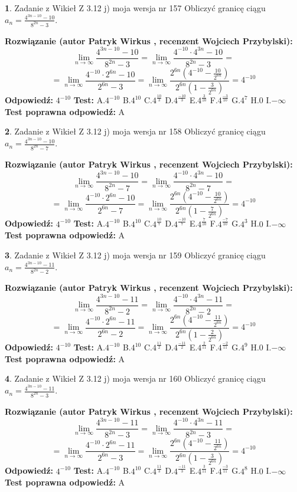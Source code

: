 \documentclass[12pt, a4paper]{article}
\theoremstyle{definition} %
\newtheorem{zad}{}
\newcommand{\zadStart}[1]{\begin{zad}#1\newline}
\newcommand{\zadStop}{\end{zad}}
\newcommand{\rozwStart}[2]{\noindent \textbf{Rozwiązanie (autor #1 , recenzent #2): }\newline}
\newcommand{\rozwStop}{\newline}
\newcommand{\odpStart}{\noindent \textbf{Odpowiedź:}\newline}
\newcommand{\odpStop}{\newline}
\newcommand{\testStart}{\noindent \textbf{Test:}\newline}
\newcommand{\testStop}{\newline}
\newcommand{\kluczStart}{\noindent \textbf{Test poprawna odpowiedź:}\newline}
\newcommand{\kluczStop}{\newline}
\begin{document}
\zadStart{Zadanie z Wikieł Z 3.12 j) moja wersja nr 157}
Obliczyć granicę ciągu $a_{n}=\frac{4^{3n-10}-10}{8^{2n}-3}$.
\zadStop
\rozwStart{Patryk Wirkus}{Wojciech Przybylski}
$$\lim\limits_{n\to\infty}\frac{4^{3n-10}-10}{8^{2n}-3}= \lim\limits_{n\to\infty}\frac{4^{-10} \cdot 4^{3n}-10}{8^{2n}-3}=$$
$$= \lim\limits_{n\to\infty}\frac{4^{-10} \cdot 2^{6n}-10}{2^{6n}-3}= \lim\limits_{n\to\infty}\frac{2^{6n}(4^{-10} - \frac{10}{2^{6n}})}{2^{6n}(1-\frac{3}{2^{6n}})}= 4^{-10}$$
\rozwStop
\odpStart
$4^{-10}$
\odpStop
\testStart
A.$4^{-10}$
B.$4^{10}$
C.$4^{\frac{10}{3}}$
D.$4^{\frac{-10}{3}}$
E.$4^{\frac{3}{10}}$
F.$4^{\frac{-3}{10}}$
G.$4^{7}$
H.$0$
I.$-\infty$
\testStop
\kluczStart
A
\kluczStop



\zadStart{Zadanie z Wikieł Z 3.12 j) moja wersja nr 158}
Obliczyć granicę ciągu $a_{n}=\frac{4^{3n-10}-10}{8^{2n}-7}$.
\zadStop
\rozwStart{Patryk Wirkus}{Wojciech Przybylski}
$$\lim\limits_{n\to\infty}\frac{4^{3n-10}-10}{8^{2n}-7}= \lim\limits_{n\to\infty}\frac{4^{-10} \cdot 4^{3n}-10}{8^{2n}-7}=$$
$$= \lim\limits_{n\to\infty}\frac{4^{-10} \cdot 2^{6n}-10}{2^{6n}-7}= \lim\limits_{n\to\infty}\frac{2^{6n}(4^{-10} - \frac{10}{2^{6n}})}{2^{6n}(1-\frac{7}{2^{6n}})}= 4^{-10}$$
\rozwStop
\odpStart
$4^{-10}$
\odpStop
\testStart
A.$4^{-10}$
B.$4^{10}$
C.$4^{\frac{10}{7}}$
D.$4^{\frac{-10}{7}}$
E.$4^{\frac{7}{10}}$
F.$4^{\frac{-7}{10}}$
G.$4^{3}$
H.$0$
I.$-\infty$
\testStop
\kluczStart
A
\kluczStop



\zadStart{Zadanie z Wikieł Z 3.12 j) moja wersja nr 159}
Obliczyć granicę ciągu $a_{n}=\frac{4^{3n-10}-11}{8^{2n}-2}$.
\zadStop
\rozwStart{Patryk Wirkus}{Wojciech Przybylski}
$$\lim\limits_{n\to\infty}\frac{4^{3n-10}-11}{8^{2n}-2}= \lim\limits_{n\to\infty}\frac{4^{-10} \cdot 4^{3n}-11}{8^{2n}-2}=$$
$$= \lim\limits_{n\to\infty}\frac{4^{-10} \cdot 2^{6n}-11}{2^{6n}-2}= \lim\limits_{n\to\infty}\frac{2^{6n}(4^{-10} - \frac{11}{2^{6n}})}{2^{6n}(1-\frac{2}{2^{6n}})}= 4^{-10}$$
\rozwStop
\odpStart
$4^{-10}$
\odpStop
\testStart
A.$4^{-10}$
B.$4^{10}$
C.$4^{\frac{11}{2}}$
D.$4^{\frac{-11}{2}}$
E.$4^{\frac{2}{11}}$
F.$4^{\frac{-2}{11}}$
G.$4^{9}$
H.$0$
I.$-\infty$
\testStop
\kluczStart
A
\kluczStop



\zadStart{Zadanie z Wikieł Z 3.12 j) moja wersja nr 160}
Obliczyć granicę ciągu $a_{n}=\frac{4^{3n-10}-11}{8^{2n}-3}$.
\zadStop
\rozwStart{Patryk Wirkus}{Wojciech Przybylski}
$$\lim\limits_{n\to\infty}\frac{4^{3n-10}-11}{8^{2n}-3}= \lim\limits_{n\to\infty}\frac{4^{-10} \cdot 4^{3n}-11}{8^{2n}-3}=$$
$$= \lim\limits_{n\to\infty}\frac{4^{-10} \cdot 2^{6n}-11}{2^{6n}-3}= \lim\limits_{n\to\infty}\frac{2^{6n}(4^{-10} - \frac{11}{2^{6n}})}{2^{6n}(1-\frac{3}{2^{6n}})}= 4^{-10}$$
\rozwStop
\odpStart
$4^{-10}$
\odpStop
\testStart
A.$4^{-10}$
B.$4^{10}$
C.$4^{\frac{11}{3}}$
D.$4^{\frac{-11}{3}}$
E.$4^{\frac{3}{11}}$
F.$4^{\frac{-3}{11}}$
G.$4^{8}$
H.$0$
I.$-\infty$
\testStop
\kluczStart
A
\kluczStop
\end{document}
